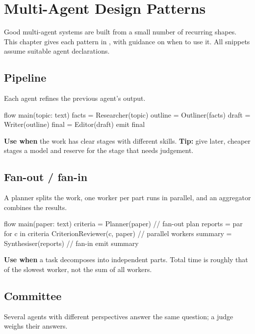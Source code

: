 \chapter{Multi-Agent Design Patterns}
\label{ch:patterns}

Good multi-agent systems are built from a small number of recurring shapes. This chapter gives each pattern in \algolang, with guidance on when to use it. All snippets assume suitable agent declarations.

\section{Pipeline}

Each agent refines the previous agent's output.

\begin{algo}
flow main(topic: text) {
    facts   = Researcher(topic)
    outline = Outliner(facts)
    draft   = Writer(outline)
    final   = Editor(draft)
    emit final
}
\end{algo}

\textbf{Use when} the work has clear stages with different skills. \textbf{Tip:} give later, cheaper stages a  model and reserve  for the stage that needs judgement.

\section{Fan-out / fan-in}

A planner splits the work, one worker per part runs in parallel, and an aggregator combines the results.

\begin{algo}
flow main(paper: text) {
    criteria = Planner(paper)                                       // fan-out plan
    reports  = par for c in criteria { CriterionReviewer(c, paper) } // parallel workers
    summary  = Synthesiser(reports)                                  // fan-in
    emit summary
}
\end{algo}

\textbf{Use when} a task decomposes into independent parts. Total time is roughly that of the slowest worker, not the sum of all workers.

\section{Committee}

Several agents with different perspectives answer the same question; a judge weighs their answers.

